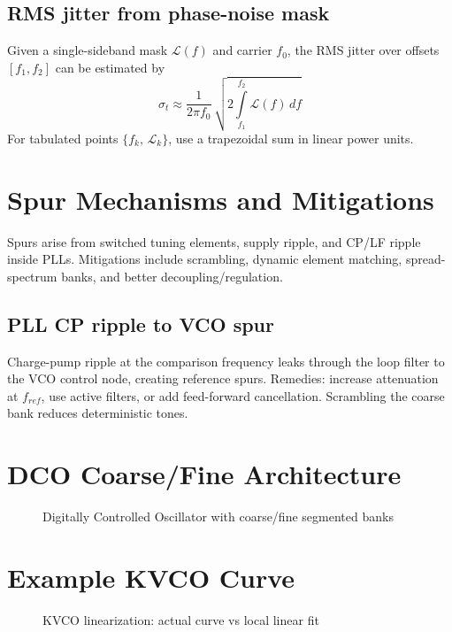 \subsection*{RMS jitter from phase-noise mask}
Given a single-sideband mask \(\mathcal{L}(f)\) and carrier \(f_0\), the RMS jitter over offsets \([f_1, f_2]\) can be estimated by
\[
 \sigma_t \approx \frac{1}{2\pi f_0}\, \sqrt{ 2\int\limits_{f_1}^{f_2} \mathcal{L}(f)\,df }
\]
For tabulated points \(\{f_k,\,\mathcal{L}_k\}\), use a trapezoidal sum in linear power units.

\section{Spur Mechanisms and Mitigations}
Spurs arise from switched tuning elements, supply ripple, and CP/LF ripple inside PLLs. Mitigations include scrambling, dynamic element matching, spread-spectrum banks, and better decoupling/regulation.

\subsection*{PLL CP ripple to VCO spur}
Charge-pump ripple at the comparison frequency leaks through the loop filter to the VCO control node, creating reference spurs. Remedies: increase attenuation at \(f_{ref}\), use active filters, or add feed-forward cancellation. Scrambling the coarse bank reduces deterministic tones.

\section{DCO Coarse/Fine Architecture}
\begin{figure}[H]
  \centering
  \caption{Digitally Controlled Oscillator with coarse/fine segmented banks}
\end{figure}

\section{Example KVCO Curve}
\begin{figure}[H]
  \centering
  \caption{KVCO linearization: actual curve vs local linear fit}
\end{figure}

